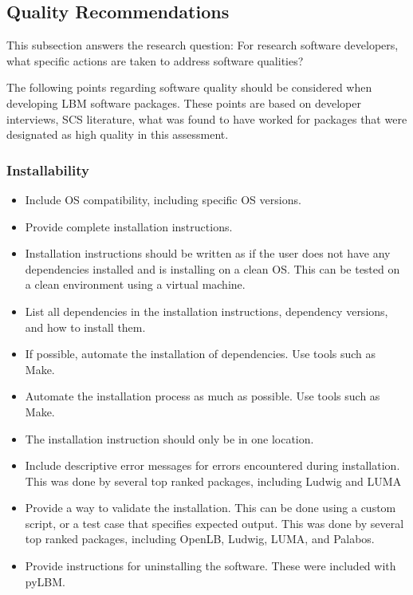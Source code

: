 \documentclass[12pt, notitlepage]{article}
\begin{document}
\subsection{Quality Recommendations}\label{qualityrecommentations}

This subsection answers the research question: For research software developers, what specific actions are taken to address software qualities?

The following points regarding software quality should be considered when developing LBM software packages. These points are based on developer interviews, SCS literature, what was found to have worked for packages that were designated as high quality in this assessment.

\subsubsection{Installability}

\begin{itemize}
	\item Include OS compatibility, including specific OS versions.
	\item Provide complete installation instructions.
	\item Installation instructions should be written as if the user does not have any dependencies installed and is installing on a clean OS. This can be tested on a clean environment using a virtual machine.
	\item List all dependencies in the installation instructions, dependency versions, and how to install them.
	\item If possible, automate the installation of dependencies. Use tools such as Make. 
	\item Automate the installation process as much as possible. Use tools such as Make.
	\item The installation instruction should only be in one location.
	\item Include descriptive error messages for errors encountered during installation. This was done by several top ranked packages, including Ludwig and LUMA
	\item Provide a way to validate the installation. This can be done using a custom script, or a test case that specifies expected output. This was done by several top ranked packages, including OpenLB, Ludwig, LUMA, and Palabos.
	\item Provide instructions for uninstalling the software. These were included with pyLBM.
\end{itemize}
\end{document}
